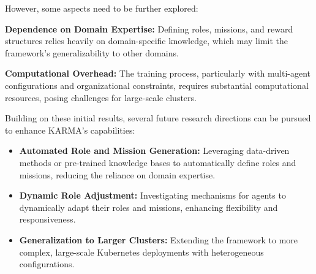 \documentclass[conference]{IEEEtran}
\begin{document}
However, some aspects need to be further explored:
\begin{enumerate*}[label=\textbf{\arabic*)}, itemjoin={;\quad }]
    \item \textbf{Dependence on Domain Expertise:} Defining roles, missions, and reward structures relies heavily on domain-specific knowledge, which may limit the framework's generalizability to other domains.
    \item \textbf{Computational Overhead:} The training process, particularly with multi-agent configurations and organizational constraints, requires substantial computational resources, posing challenges for large-scale clusters.
\end{enumerate*}

Building on these initial results, several future research directions can be pursued to enhance KARMA's capabilities:
\begin{itemize}
    \item \textbf{Automated Role and Mission Generation:} Leveraging data-driven methods or pre-trained knowledge bases to automatically define roles and missions, reducing the reliance on domain expertise.
    \item \textbf{Dynamic Role Adjustment:} Investigating mechanisms for agents to dynamically adapt their roles and missions, enhancing flexibility and responsiveness.
    \item \textbf{Generalization to Larger Clusters:} Extending the framework to more complex, large-scale Kubernetes deployments with heterogeneous configurations.
\end{itemize}
\end{document}

